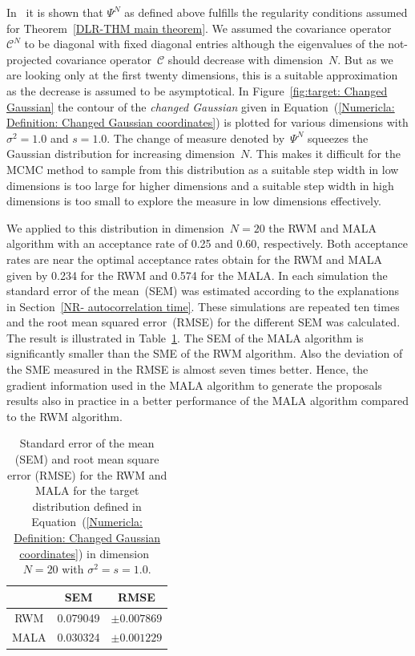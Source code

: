 In~\autocite[Remark 2.3]{Pillai2012} it is shown that $\Psi^N$ as defined above fulfills the regularity conditions assumed for Theorem~\ref{DLR-THM main theorem}. We assumed the covariance operator~$\mathcal{C}^N$ to be diagonal with fixed diagonal entries although the eigenvalues of the not-projected covariance operator~$\mathcal{C}$ should decrease with dimension~$N$. But as we are looking only at the first twenty dimensions, this is a suitable approximation as the decrease is assumed to be asymptotical. In Figure~\ref{fig:target: Changed Gaussian} the contour of the \textit{changed Gaussian} given in Equation~(\ref{Numericla: Definition: Changed Gaussian coordinates}) is plotted for various dimensions with $\sigma^2=1.0$ and $s=1.0$. The change of measure denoted by~$\Psi^N$ squeezes the Gaussian distribution for increasing dimension~$N$. This makes it difficult for the MCMC method to sample from this distribution as a suitable step width in low dimensions is too large for higher dimensions and a suitable step width in high dimensions is too small to explore the measure in low dimensions effectively.


We applied to this distribution in dimension~$N=20$ the RWM and MALA algorithm with an acceptance rate of 0.25 and 0.60, respectively. Both acceptance rates are near the optimal acceptance rates obtain for the RWM and MALA given by 0.234 for the RWM and 0.574 for the MALA. In each simulation the standard error of the mean~(SEM) was estimated according to the explanations in Section~\ref{NR- autocorrelation time}. These simulations are repeated ten times and the root mean squared error~(RMSE) for the different SEM was calculated. The result is illustrated in Table~\ref{Numerical: Tabular Comparison RWM and MALA}. The SEM of the MALA algorithm is significantly smaller than the SME of the RWM algorithm. Also the deviation of the SME measured in the RMSE is almost seven times better. Hence, the gradient information used in the MALA algorithm to generate the proposals results also in practice in a better performance of the MALA algorithm compared to the RWM algorithm.

\begin{table}%
\centering
 \begin{tabular}{ccc}
     &	SEM	&	RMSE \\ 
  \hline 
 RWM & 0.079049 & $\pm 0.007869$ \\ [1mm]
 MALA & 0.030324 & $\pm 0.001229$ \\
\end{tabular}
 \caption{Standard error of the mean (SEM) and root mean square error (RMSE) for the RWM and MALA for the target distribution defined in Equation~(\ref{Numericla: Definition: Changed Gaussian coordinates}) in dimension~$N=20$ with $\sigma^2=s=1.0$.}
 \label{Numerical: Tabular Comparison RWM and MALA}
\end{table}



